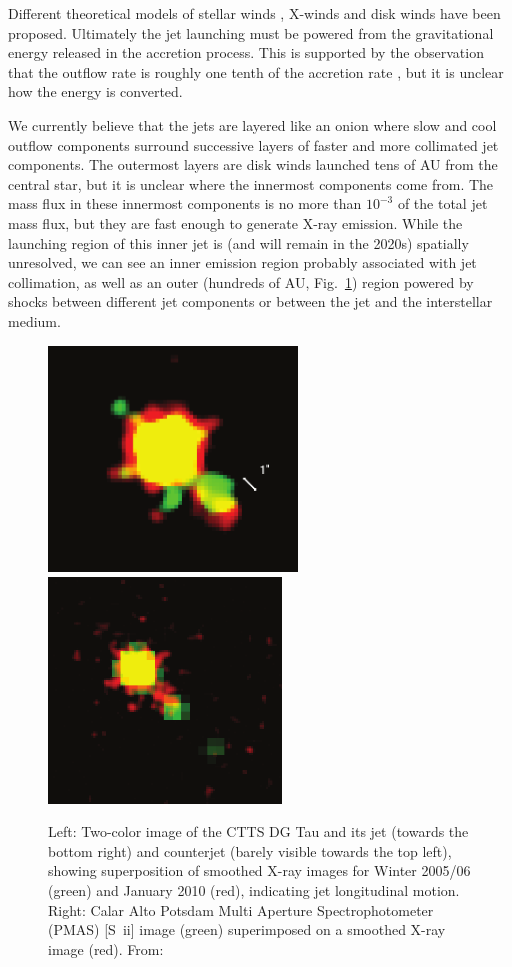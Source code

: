 \documentclass[12pt]{article}
\begin{document}
Different theoretical models of stellar winds \citep{1988ApJ...332L..41K,2005ApJ...632L.135M}, X-winds \citep{1994ApJ...429..781S} and disk winds \citep{1982MNRAS.199..883B,2005ApJ...630..945A} have been proposed. Ultimately the jet launching must be powered from the gravitational energy released in the accretion process. This is supported by the observation that the outflow rate is roughly one tenth of the accretion rate \citep{1990ApJ...354..687C,2008ApJ...689.1112C}, but it is unclear how the energy is converted. 

We currently believe that the jets are layered like an onion where slow and
cool outflow components surround successive layers of faster and more
collimated jet components. The outermost layers are disk winds launched tens of
AU from the central star, but it is unclear where the innermost components come
from. The mass flux in these innermost components is no more than $10^{-3}$ \citep{2009A&A...493..579G} of
the total jet mass flux, but they are fast enough to generate X-ray emission.
While the launching region of this inner jet is (and will remain in the 2020s) spatially unresolved, we can see an inner \citep[10-40 AU][]{2008A&A...488L..13S} emission region probably associated with jet collimation, as well as an outer (hundreds of AU, Fig.~\ref{fig:Xray}) region powered by shocks between different jet components or between the jet and the interstellar medium. 

\begin{figure}[htb]
\centering
\includegraphics[height=6cm]{xjetmotion.png}
\includegraphics[height=6cm]{xjetmotion2.png}
\caption{Left: Two-color image of the CTTS DG Tau and its jet (towards the bottom right) and counterjet (barely visible towards the top left), showing superposition of smoothed X-ray
images for Winter 2005/06 (green) and January 2010 (red), indicating jet
longitudinal motion. Right: Calar Alto Potsdam Multi Aperture Spectrophotometer
(PMAS) [S~{\sc ii}] image (green) superimposed on a smoothed X-ray image
(red). From: }
\label{fig:Xray}
\end{figure}
\end{document}
